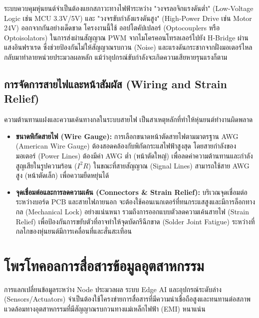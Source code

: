 ระบบควบคุมหุ่นยนต์จำเป็นต้องแยกสภาวะทางไฟฟ้าระหว่าง "วงจรลอจิกแรงดันต่ำ" (Low-Voltage Logic เช่น MCU 3.3V/5V) และ "วงจรขับกำลังแรงดันสูง" (High-Power Drive เช่น Motor 24V) ออกจากกันอย่างเด็ดขาด โครงงานนี้ใช้ ออปโตคัปเปลอร์ (Optocouplers หรือ Optoisolators) ในการส่งผ่านสัญญาณ PWM จากไมโครคอนโทรลเลอร์ไปยัง H-Bridge ผ่านแสงอินฟราเรด ซึ่งช่วยป้องกันไม่ให้สัญญาณรบกวน (Noise) และแรงดันกระชากจากฝั่งมอเตอร์ไหลกลับมาทำลายหน่วยประมวลผลหลัก แม้ว่าอุปกรณ์ขับกำลังจะเกิดความเสียหายรุนแรงก็ตาม

\subsection{การจัดการสายไฟและหน้าสัมผัส (Wiring and Strain Relief)}
ความต้านทานแฝงและความเค้นทางกลในระบบสายไฟ เป็นสาเหตุหลักที่ทำให้หุ่นยนต์ทำงานผิดพลาด
\begin{itemize}
    \item \textbf{ขนาดพิกัดสายไฟ (Wire Gauge):} การเลือกขนาดหน้าตัดสายไฟตามมาตรฐาน AWG (American Wire Gauge) ต้องสอดคล้องกับพิกัดกระแสไฟฟ้าสูงสุด โดยสายกำลังของมอเตอร์ (Power Lines) ต้องมีค่า AWG ต่ำ (หน้าตัดใหญ่) เพื่อลดค่าความต้านทานและกำลังสูญเสียในรูปความร้อน ($I^2R$) ในขณะที่สายสัญญาณ (Signal Lines) สามารถใช้สาย AWG สูง (หน้าตัดเล็ก) เพื่อความยืดหยุ่นได้
    \item \textbf{จุดเชื่อมต่อและการลดความเค้น (Connectors \& Strain Relief):} บริเวณจุดเชื่อมต่อระหว่างบอร์ด PCB และสายไฟภายนอก จะต้องใช้คอนเนกเตอร์ที่ทนกระแสสูงและมีการล็อกทางกล (Mechanical Lock) อย่างแน่นหนา รวมถึงการออกแบบตัวลดความเค้นสายไฟ (Strain Relief) เพื่อป้องกันการขยับตัวที่อาจทำให้จุดบัดกรีฉีกขาด (Solder Joint Fatigue) ระหว่างที่กลไกของหุ่นยนต์มีการเคลื่อนที่และสั่นสะเทือน
\end{itemize}

\section{โพรโทคอลการสื่อสารข้อมูลอุตสาหกรรม}
\label{sec:communication_protocols}

การแลกเปลี่ยนข้อมูลระหว่าง Node ประมวลผล ระบบ Edge AI และอุปกรณ์ระดับล่าง (Sensors/Actuators) จำเป็นต้องใช้โครงข่ายการสื่อสารที่มีความน่าเชื่อถือสูงและทนทานต่อสภาพแวดล้อมทางอุตสาหกรรมที่มีสัญญาณรบกวนทางแม่เหล็กไฟฟ้า (EMI) หนาแน่น

